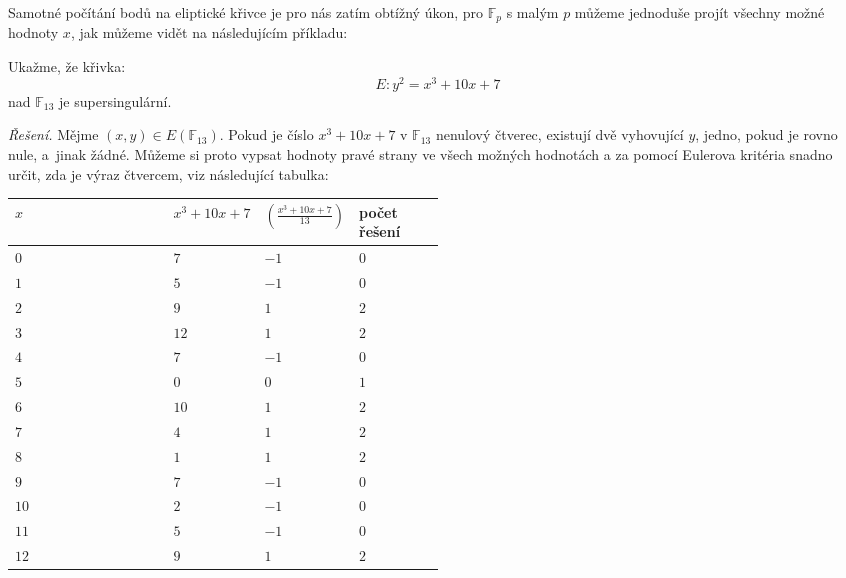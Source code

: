 \documentclass[12pt]{report}
\begin{document}
Samotné počítání bodů na eliptické křivce je pro nás zatím obtížný úkon, pro $\mathbb{F}_p$ s malým $p$ můžeme jednoduše projít všechny možné hodnoty $x$, jak můžeme vidět na následujícím příkladu:
\begin{priklad}
Ukažme, že křivka:
$$E: y^2 = x^3+10x+7$$
nad $\mathbb{F}_{13}$ je supersingulární.
\end{priklad}
\noindent \textit{Řešení.} Mějme $(x,y) \in E(\mathbb{F}_{13})$. Pokud je číslo $x^3+10x+7$ v $\mathbb{F}_{13}$ nenulový čtverec, existují dvě vyhovující $y$, jedno, pokud je rovno nule, a~jinak žádné. Můžeme si proto vypsat hodnoty pravé strany ve všech možných hodnotách a za pomocí Eulerova kritéria snadno určit, zda je výraz čtvercem, viz následující tabulka:

\begin{longtable}[H]{l>{\centering}p{0.2\linewidth}>{\raggedleft}p{0.1\linewidth}>{\centering\arraybackslash}p{0.2\linewidth}}
\toprule
$x$ & $x^3+10x+7$ & $\genfrac{(}{)}{}{}{x^3+10x+7}{13}$ & počet řešení\\
\midrule
$0$ & $7$  & $-1\quad\;$  & $0$\\
$1$ & $5$  & $-1\quad\;$  & $0$\\
$2$ & $9$  & $1\quad\;$  & $2$\\
$3$ & $12$  & $1\quad\;$  & $2$\\
$4$ & $7$  & $-1\quad\;$  & $0$\\
$5$ & $0$  & $0\quad\;$  & $1$\\
$6$ & $10$  & $1\quad\;$  & $2$\\
$7$ & $4$  & $1\quad\;$  & $2$\\
$8$ & $1$  & $1\quad\;$  & $2$\\
$9$ & $7$  & $-1\quad\;$  & $0$\\
$10$ & $2$  & $-1\quad\;$  & $0$\\
$11$ & $5$  & $-1\quad\;$  & $0$\\
$12$ & $9$  & $1\quad\;$  & $2$\\
\bottomrule 
\end{longtable}
\end{document}
